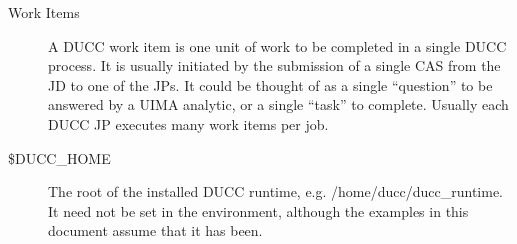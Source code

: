\begin{description}
\item[Work Items] A DUCC work item is one unit of work to be completed in a single DUCC process. It
  is usually initiated by the submission of a single CAS from the JD to one of the JPs. It could be
  thought of as a single ``question'' to be answered by a UIMA analytic, or a single ``task'' to
  complete. Usually each DUCC JP executes many work items per job.

\item[\$DUCC_HOME] The root of the installed DUCC runtime, e.g. /home/ducc/ducc_runtime.  
  It need not be set in the environment, although the examples in this document assume that it has been.

\end{description}


